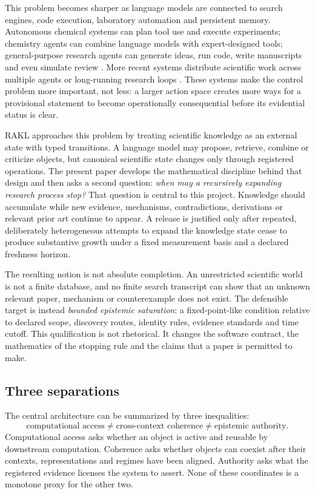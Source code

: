 \documentclass[11pt]{article}
\newcommand{\RAKL}{RAKL}
\begin{document}
This problem becomes sharper as language models are connected to search engines, code execution, laboratory automation and persistent memory. Autonomous chemical systems can plan tool use and execute experiments; chemistry agents can combine language models with expert-designed tools; general-purpose research agents can generate ideas, run code, write manuscripts and even simulate review \cite{boiko2023,bran2024,lu2024}. More recent systems distribute scientific work across multiple agents or long-running research loops \cite{gottweis2025,kosmos2025}. These systems make the control problem more important, not less: a larger action space creates more ways for a provisional statement to become operationally consequential before its evidential status is clear.

\RAKL{} approaches this problem by treating scientific knowledge as an external state with typed transitions. A language model may propose, retrieve, combine or criticize objects, but canonical scientific state changes only through registered operations. The present paper develops the mathematical discipline behind that design and then asks a second question: \emph{when may a recursively expanding research process stop?} That question is central to this project. Knowledge should accumulate while new evidence, mechanisms, contradictions, derivations or relevant prior art continue to appear. A release is justified only after repeated, deliberately heterogeneous attempts to expand the knowledge state cease to produce substantive growth under a fixed measurement basis and a declared freshness horizon.

The resulting notion is not absolute completion. An unrestricted scientific world is not a finite database, and no finite search transcript can show that an unknown relevant paper, mechanism or counterexample does not exist. The defensible target is instead \emph{bounded epistemic saturation}: a fixed-point-like condition relative to declared scope, discovery routes, identity rules, evidence standards and time cutoff. This qualification is not rhetorical. It changes the software contract, the mathematics of the stopping rule and the claims that a paper is permitted to make.

\subsection{Three separations}

The central architecture can be summarized by three inequalities:
\[
\boxed{\text{computational access}\neq\text{cross-context coherence}\neq\text{epistemic authority}.}
\]
Computational access asks whether an object is active and reusable by downstream computation. Coherence asks whether objects can coexist after their contexts, representations and regimes have been aligned. Authority asks what the registered evidence licenses the system to assert. None of these coordinates is a monotone proxy for the other two.
\end{document}
